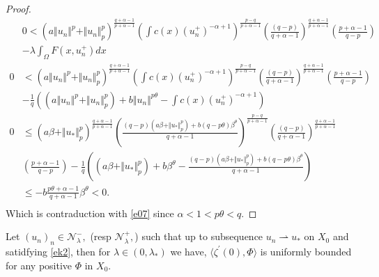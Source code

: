 \documentclass[10pt,twoside,reqno,centertags,draft]{amsart}
\begin{document}
\begin{proof}
\begin{equation}
\begin{aligned}
 &0 < \left( a \Vert u_n \Vert^p + \Vert u_n \Vert_{p}^{p}\right)^{\frac{q+ \alpha-1}{p+ \alpha-1}}\left(\int c(x)(u_n^+)^{-\alpha+1}\right)^{\frac{p-q}{p+\alpha -1}}\left(\frac{(q-p)}{q+\alpha-1} \right)^{\frac{q+\alpha-1}{p+\alpha-1}}\left(\frac{p+\alpha -1}{q-p}\right)\\ 
& -\lambda\int_{\Omega}F(x,u_n^+)dx\\
 0 &< \left( a \Vert u_n \Vert^p + \Vert u_n \Vert_{p}^{p}\right)^{\frac{q+ \alpha-1}{p+ \alpha-1}}\left(\int c(x)(u_n^+)^{-\alpha+1}\right)^{\frac{p-q}{p+\alpha -1}}\left(\frac{(q-p)}{q+\alpha-1} \right)^{\frac{q+\alpha-1}{p+\alpha-1}}\left(\frac{p+\alpha -1}{q-p}\right)\\
 & -\frac{1}{q}\left(\left( a \Vert u_n \Vert^p + \Vert u_n \Vert_{p}^{p}\right) + b \Vert u_n \Vert^{p \theta}  - \int c(x)(u_n^+)^{-\alpha+1}\right)\\
 0 &\leq \left( a\beta + \Vert u_* \Vert_{p}^{p}\right)^{\frac{q+ \alpha-1}{p+ \alpha-1}}\left(\frac{(q-p) \left(a\beta + \Vert u_* \Vert_{p}^{p}\right) + b(q -p\theta) \beta^{\theta}}{q +\alpha -1}\right)^{\frac{p-q}{p+\alpha -1}}\left(\frac{(q-p)}{q+\alpha-1} \right)^{\frac{q+\alpha-1}{p+\alpha-1}}\\
 &\left(\frac{p+\alpha -1}{q-p}\right) -\frac{1}{q}\left(\left( a\beta + \Vert u_* \Vert_{p}^{p}\right) + b \beta^{\theta}  - \frac{(q-p) \left(a\beta + \Vert u_* \Vert_{p}^{p}\right) + b(q -p\theta) \beta^{\theta}}{q +\alpha -1}\right)\\  
  &\leq  -b\frac{p\theta +\alpha -1}{q+ \alpha -1}\beta^{\theta} < 0.\\ 
\end{aligned}
\end{equation}
Which is contraduction with \ref{e07} since $ \alpha <1 <p\theta<q.$
\end{proof}
\begin{lemma}\label{l7}
Let $ (u_n)_n \in \mathcal{N}_{\lambda}^{-},$ (resp $ \mathcal{N}_{\lambda}^{+},$) such that up to subsequence  $ u_n \rightharpoonup u_*$ on $ X_0$ and satidfying 
\ref{ek2}, then for $ \lambda \in (0, \lambda_*)$ we have, $ \langle\zeta^{\prime}(0), \Phi \rangle$ is uniformly bounded for any positive $ \Phi$ in $ X_0.$
\end{lemma}
\end{document}
